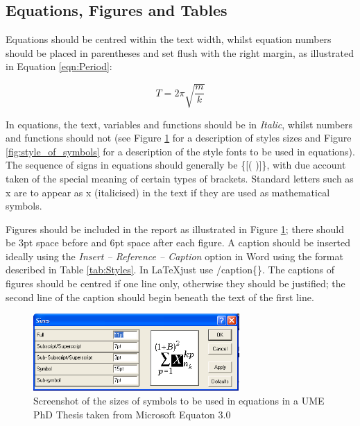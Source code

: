 \subsection{Equations, Figures and Tables}
Equations should be centred within the text width, whilst equation numbers should be placed in parentheses and set flush with the right margin, as illustrated in Equation \eqref{eqn:Period}:

\begin{equation}
    \label{eqn:Period}
    T=2\pi\sqrt{\frac{m}{k}}
\end{equation}

In equations, the text, variables and functions should be in \textit{Italic}, whilst numbers and functions should not (see Figure \ref{fig:size_of_symbols} for a description of styles sizes and Figure \ref{fig:style_of_symbols} for a description of the style fonts to be used in equations). The sequence of signs in equations should generally be \{[(  )]\}, with due account taken of the special meaning of certain types of brackets. Standard letters such as x are to appear as x (italicised) in the text if they are used as mathematical symbols.\par
Figures should be included in the report as illustrated in Figure \ref{fig:size_of_symbols}; there should be 3pt space before and 6pt space after each figure. A caption should be inserted ideally using the \textit{Insert – Reference – Caption} option in Word using the format described in Table \ref{tab:Styles}. In \LaTeX \space just use \slash{caption\{\}}. The captions of figures should be centred if one line only, otherwise they should be justified; the second line of the caption should begin beneath the text of the first line. 

\begin{figure}[hbt!]
    \centering
    \includegraphics[width=0.7\textwidth]{Figures/Equation_Font.png}
    \caption{Screenshot of the sizes of symbols to be used in equations in a UME PhD Thesis taken from Microsoft Equaton 3.0}
    \label{fig:size_of_symbols}
\end{figure}

